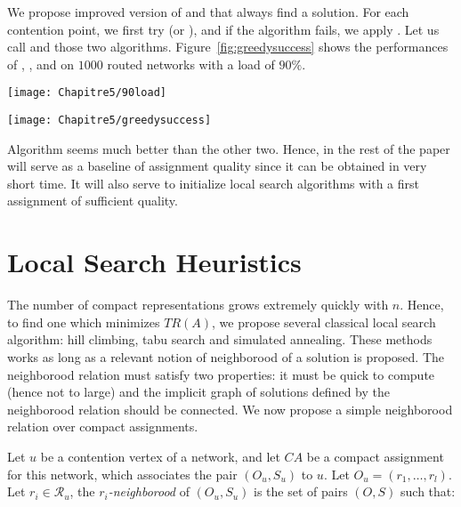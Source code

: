 We propose improved version of \greedydeadline and \greedynormalized that always find a solution. For each contention point, we first try \greedydeadline (or \greedynormalized), 
and if the algorithm fails, we apply \greedypacked. Let us call \hybridgreedydeadline and \hybridgreedynormalized those two algorithms. Figure~\ref{fig:greedysuccess} shows the performances of \hybridgreedydeadline, \hybridgreedynormalized, and \greedypacked on $1000$ routed networks with a load of $90\%$.

 	\begin{minipage}[c]{.45\linewidth}
	\centering
	\texttt{[image: Chapitre5/90load]}
\label{fig:90load}
\end{minipage}
\begin{minipage}[c]{.45\linewidth}
	\centering
	\texttt{[image: Chapitre5/greedysuccess]}
\label{fig:greedysuccess}
\end{minipage}

Algorithm \hybridgreedynormalized seems much better than the other two. Hence, in the rest of the paper \hybridgreedynormalized will serve 
as a baseline of assignment quality since it can be obtained in very short time. It will also serve to initialize 
local search algorithms with a first assignment of sufficient quality.

\section{Local Search Heuristics}

The number of compact representations grows extremely quickly with $n$. Hence, to find one which minimizes $TR(A)$, we propose several classical local search algorithm: hill climbing, tabu search and simulated annealing. These methods works as long as a relevant notion of neighborood of a solution is proposed. The neighborood relation must satisfy two properties: it must be quick to compute (hence not to large) and the implicit graph of solutions defined
by the neighborood relation should be connected. We now propose a simple neighborood relation over compact assignments.

Let $u$ be a contention vertex of a network, and let $CA$ be a compact assignment for this network, 
 which associates the pair $(O_u,S_u)$ to $u$. Let $O_u = (r_1,\dots,r_l)$.
  Let $r_i \in \mathcal{R}_u$, the \emph{$r_i$-neighborood} of $(O_u,S_u)$ is the set of pairs $(O,S)$ such that:
 
